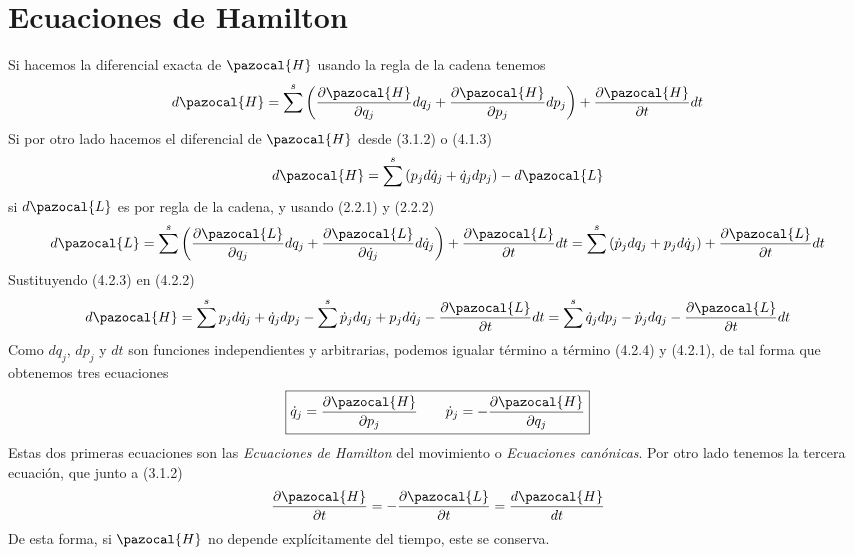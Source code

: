 \section{Ecuaciones de Hamilton} 
Si hacemos la diferencial exacta de $\pazocal{H}$ usando la regla de la cadena tenemos
\begin{equation} \label{4.2.1}
    d\pazocal{H} = \sum^s\left(\frac{\partial \pazocal{H}}{\partial q_j}dq_j+\frac{\partial \pazocal{H}}{\partial p_j}dp_j\right)+\frac{\partial \pazocal{H}}{\partial t} dt
\end{equation} 
Si por otro lado hacemos el diferencial de $\pazocal{H}$ desde (3.1.2) o (4.1.3)
\begin{equation} \label{4.2.2}
    d\pazocal{H} = \sum^s\left(p_j d\dot{q}_j+\dot{q}_j dp_j\right)-d\pazocal{L}
\end{equation} 
si $d\pazocal{L}$ es por regla de la cadena, y usando (2.2.1) y (2.2.2)
\begin{equation} \label{4.2.3}
    d\pazocal{L}= \sum^s\left(\frac{\partial \pazocal{L}}{\partial q_j}dq_j+\frac{\partial \pazocal{L}}{\partial \dot{q}_j}d\dot{q}_j\right) + \frac{\partial \pazocal{L}}{\partial t}dt = \sum^s\left(\dot{p}_j dq_j+p_j d\dot{q}_j\right) + \frac{\partial \pazocal{L}}{\partial t}dt
\end{equation} 
Sustituyendo (4.2.3) en (4.2.2)
\begin{equation} \label{4.2.4}
    d\pazocal{H} = \sum^s p_j d\dot{q}_j+\dot{q}_j dp_j-\sum^s \dot{p}_j dq_j+p_j d\dot{q}_j - \frac{\partial \pazocal{L}}{\partial t}dt = \sum^s \dot{q}_j dp_j-\dot{p}_j dq_j - \frac{\partial \pazocal{L}}{\partial t}dt
\end{equation} 
Como $dq_j$, $dp_j$ y $dt$ son funciones independientes y arbitrarias, podemos igualar término a término (4.2.4) y (4.2.1), de tal forma que obtenemos tres ecuaciones
\Large \begin{equation} \label{4.2.5}
    \boxed{\dot{q}_j = \frac{\partial \pazocal{H}}{\partial p_j} \ \ \ \ \ \ \dot{p}_j= -\frac{\partial \pazocal{H}}{\partial q_j}}
\end{equation}  \normalsize
Estas dos primeras ecuaciones son las \textit{Ecuaciones de Hamilton} del movimiento o \textit{Ecuaciones canónicas}. Por otro lado tenemos la tercera ecuación, que junto a (3.1.2)
\begin{equation} \label{4.2.6}
    \frac{\partial \pazocal{H}}{\partial t} = - \frac{\partial \pazocal{L}}{\partial t} = \frac{d \pazocal{H}}{dt}
\end{equation} 
De esta forma, si $\pazocal{H}$ no depende explícitamente del tiempo, este se conserva.

